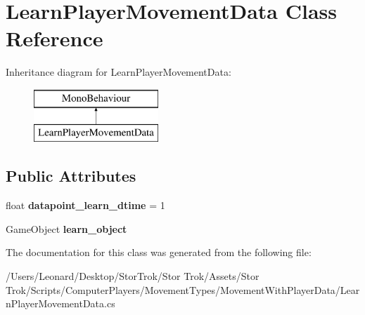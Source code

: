 \hypertarget{class_learn_player_movement_data}{}\section{Learn\+Player\+Movement\+Data Class Reference}
\label{class_learn_player_movement_data}
Inheritance diagram for Learn\+Player\+Movement\+Data\+:\begin{figure}[H]
\begin{center}
\leavevmode
\includegraphics[height=2.000000cm]{class_learn_player_movement_data}
\end{center}
\end{figure}
\subsection*{Public Attributes}
\begin{DoxyCompactItemize}
\item 
\mbox{\label{class_learn_player_movement_data_a54c0297008dc7664bc24ea1135d08354}} 
float {\bfseries datapoint\+\_\+learn\+\_\+dtime} = 1
\item 
\mbox{\label{class_learn_player_movement_data_aad7ad01cf53e8eb90562a82f4aeb771e}} 
Game\+Object {\bfseries learn\+\_\+object}
\end{DoxyCompactItemize}


The documentation for this class was generated from the following file\+:\begin{DoxyCompactItemize}
\item 
/\+Users/\+Leonard/\+Desktop/\+Stor\+Trok/\+Stor Trok/\+Assets/\+Stor Trok/\+Scripts/\+Computer\+Players/\+Movement\+Types/\+Movement\+With\+Player\+Data/Learn\+Player\+Movement\+Data.\+cs\end{DoxyCompactItemize}
